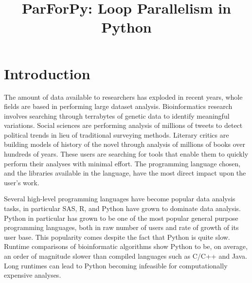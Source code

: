 \documentclass[conference]{IEEEtran}
\begin{document}
\title{ParForPy: Loop Parallelism in Python}
\author{
}

\maketitle

\begin{abstract}

\end{abstract}

\section{Introduction}


The amount of data available to researchers has exploded in recent years,
whole fields are based in performing large dataset analysis.
Bioinformatics research involves searching through terrabytes of genetic data
to identify meaningful variations\cite{bolstad2003comparison}.
Social sciences are performing analysis of millions of tweets to detect political trends in lieu of traditional surveying methods. 
\cite{cody2016public}
Literary critics are building models of history of the novel through analysis of millions of books over hundreds of years\cite{moretti2005graphs}.
These users are searching for tools that enable them to quickly perform 
their analyses with minimal effort.
The programming language chosen, and the libraries available in the language, 
have the most direct impact upon the user's work.

Several high-level programming languages have become popular data analysis tasks, in particular SAS\cite{sas2004sas}, R\cite{team2000r}, and Python\cite{vanrossum2010python} have grown to dominate data analysis\cite{kdnuggetSurvey}.
Python in particular has grown to be one of the most popular general purpose programming languages, both in raw number of users\cite{kdnuggetSurvey} and rate 
of growth of its user base\cite{kdnuggetGrowthSurvey}.
This popularity comes despite the fact that Python is quite slow.
Runtime comparisons of bioinformatic algorithms
show Python to be, on average, an order of magnitude slower than 
compiled languages such as C/C++ and Java\cite{fourment2008comparison}.
Long runtimes can lead to Python becoming infeasible
for computationally expensive analyses.
\end{document}
